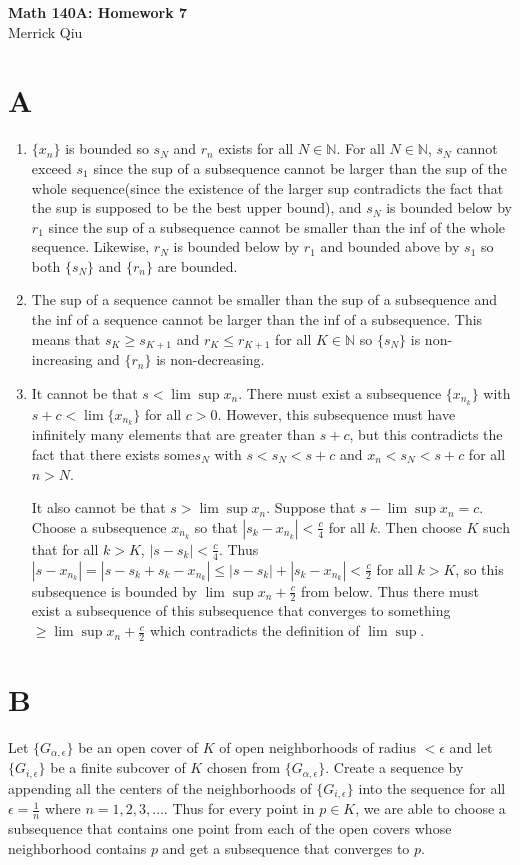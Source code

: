 \documentclass{article}
\begin{document}
\begin{center}
	\huge{\bf Math 140A: Homework 7} \\
	Merrick Qiu
\end{center}

\section*{A}
\begin{enumerate}
	\item $\{x_n\}$ is bounded so $s_N$ and $r_n$ exists for all $N \in \mathbb{N}$.
	For all $N \in \mathbb{N}$, $s_N$ cannot exceed $s_1$ since the sup of a subsequence cannot be larger
	than the sup of the whole sequence(since the existence of the larger sup contradicts
	the fact that the sup is supposed to be the best upper bound),
	and $s_N$ is bounded below by $r_1$ since the sup of a subsequence cannot be 
	smaller than the inf of the whole sequence.
	Likewise, $r_N$ is bounded below by $r_1$ and bounded above by $s_1$ so 
	both $\{s_N\}$ and $\{r_n\}$ are bounded.
	\item The sup of a sequence cannot be smaller than the sup of a subsequence
	and the inf of a sequence cannot be larger than the inf of a subsequence.
	This means that $s_K \geq s_{K+1}$  and $r_K \leq r_{K+1}$ for all $K \in \mathbb{N}$
	so $\{s_N\}$ is non-increasing and $\{r_n\}$ is non-decreasing.
	\item It cannot be that $s < \lim \sup x_n$. There must exist a 
	subsequence $\{x_{n_k}\}$
	with $s +c <\lim \{x_{n_k}\}$ for all $c > 0$.
	However, this subsequence must have infinitely many elements that are greater 
	than $s+c$, but this contradicts the fact that there exists some$s_N$ with $s < s_N < s+c$
	and $x_n < s_N < s+c$ for all $n > N$.

	It also cannot be that $s > \lim \sup x_n$.
	Suppose that $s - \lim \sup x_n = c$.
	Choose a subsequence $x_{n_k}$ so that $|s_k - x_{n_k}| < \frac{c}{4}$ for all $k$.
	Then choose $K$ such that for all $k > K$, $|s - s_{k}| < \frac{c}{4}$.
	Thus $|s - x_{n_k}| = |s - s_{k} + s_{k} - x_{n_k}| \leq  |s - s_{k}| + |s_{k} - x_{n_k}| < \frac{c}{2}$
	for all $k > K$, so this subsequence is bounded by $\lim \sup x_n + \frac{c}{2}$ from below.
	Thus there must exist a subsequence of this subsequence that converges to something 
	$\geq \lim \sup x_n + \frac{c}{2}$ which contradicts the definition of $\lim \sup$.
\end{enumerate}
\newpage 

\section*{B}
Let $\{G_{\alpha, \epsilon}\}$ be an open cover of $K$ of open neighborhoods of radius $<\epsilon $
and let $\{G_{i, \epsilon}\}$ be a finite subcover of $K$ chosen from $\{G_{\alpha, \epsilon}\}$.
Create a sequence by appending all the centers of the neighborhoods of $\{G_{i, \epsilon}\}$ into the sequence
for all $\epsilon = \frac{1}{n}$ where $n = 1,2,3, \dots$.
Thus for every point in $p \in K$, we are able to choose a subsequence that contains
one point from each of the open covers whose neighborhood contains $p$
and get a subsequence that converges to $p$.
\newpage 
\end{document}
